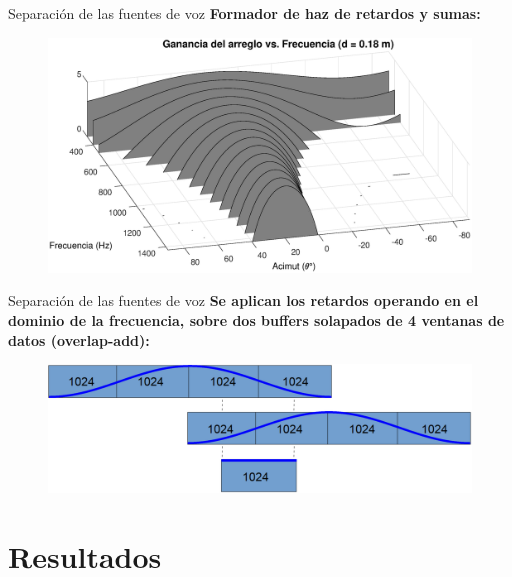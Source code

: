 \documentclass[12pt,aspectratio=169]{beamer}
\begin{document}
	\begin{frame}{Separación de las fuentes de voz}
		\textbf{Formador de haz de retardos y sumas:}\\	
		\vspace{5mm}
		\begin{figure}[h]
			\centering
			\includegraphics[width=0.8\linewidth]{figures/patternvsfreq}
		\end{figure}
	\end{frame}
	
	\begin{frame}{Separación de las fuentes de voz}
		\textbf{Se aplican los retardos operando en el dominio de la frecuencia, sobre dos buffers solapados de 4 ventanas de datos (overlap-add):}\\		
		\vspace{5mm}
		\begin{figure}[h]
			\centering
			\includegraphics[width=0.8\linewidth]{figures/Buffers.eps}
		\end{figure}
	\end{frame}
	
	\section{Resultados}
	
	
\end{document}
